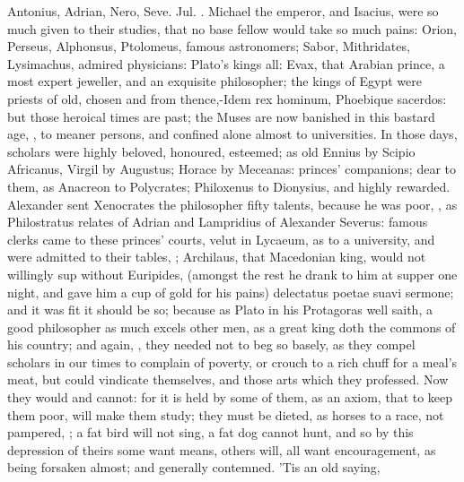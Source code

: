 {Antonius, Adrian, Nero, Seve. Jul. \etc{}. Michael the emperor,
and Isacius, were so much given to their studies, that no base fellow
would take so much pains: Orion, Perseus, Alphonsus, Ptolomeus, famous
astronomers; Sabor, Mithridates, Lysimachus, admired physicians:
Plato's kings all: Evax, that Arabian prince, a most expert jeweller,
and an exquisite philosopher; the kings of Egypt were priests of old,
chosen and from thence,-Idem rex hominum, Phoebique sacerdos: but those
heroical times are past; the Muses are now banished in this bastard
age, , to meaner persons, and confined alone almost
to universities. In those days, scholars were highly beloved,
honoured, esteemed; as old Ennius by Scipio Africanus, Virgil by
Augustus; Horace by Meceanas: princes' companions; dear to them, as
Anacreon to Polycrates; Philoxenus to Dionysius, and highly rewarded.
Alexander sent Xenocrates the philosopher fifty talents, because he was
poor, , as Philostratus relates of Adrian and Lampridius of Alexander
Severus: famous clerks came to these princes' courts, velut in Lycaeum,
as to a university, and were admitted to their tables, ; Archilaus, that Macedonian king, would not
willingly sup without Euripides, (amongst the rest he drank to him at
supper one night, and gave him a cup of gold for his pains) delectatus
poetae suavi sermone; and it was fit it should be so; because as
Plato in his Protagoras well saith, a good philosopher as much
excels other men, as a great king doth the commons of his country; and
again, , they
needed not to beg so basely, as they compel scholars in our times
to complain of poverty, or crouch to a rich chuff for a meal's meat,
but could vindicate themselves, and those arts which they professed.
Now they would and cannot: for it is held by some of them, as an axiom,
that to keep them poor, will make them study; they must be dieted, as
horses to a race, not pampered, ; a fat bird will not sing, a
fat dog cannot hunt, and so by this depression of theirs some
want means, others will, all want encouragement, as being
forsaken almost; and generally contemned. 'Tis an old saying, }
